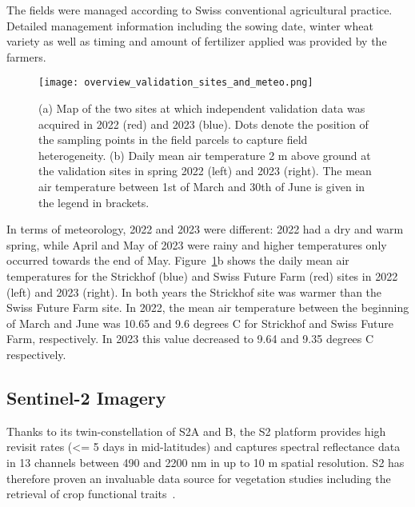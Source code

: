 The fields were managed according to Swiss conventional agricultural practice. Detailed management information including the sowing date, winter wheat variety as well as timing and amount of fertilizer applied was provided by the farmers.

\begin{figure}[H]
    \centering
    \texttt{[image: overview\_validation\_sites\_and\_meteo.png]}
    \caption{(a) Map of the two sites at which independent validation data was acquired in 2022 (red) and 2023 (blue). Dots denote the position of the sampling points in the field parcels to capture field heterogeneity. (b) Daily mean air temperature 2 m above ground at the validation sites in spring 2022 (left) and 2023 (right). The mean air temperature between 1st of March and 30th of June is given in the legend in brackets.}
    \label{fig:map-validation-sites}
\end{figure}

In terms of meteorology, 2022 and 2023 were different: 2022 had a dry and warm spring, while April and May of 2023 were rainy and higher temperatures only occurred towards the end of May. Figure~\ref{fig:map-validation-sites}b shows the daily mean air temperatures for the Strickhof (blue) and Swiss Future Farm (red) sites in 2022 (left) and 2023 (right). In both years the Strickhof site was warmer than the Swiss Future Farm site. In 2022, the mean air temperature between the beginning of March and June was 10.65 and 9.6 degrees C for Strickhof and Swiss Future Farm, respectively. In 2023 this value decreased to 9.64 and 9.35 degrees C respectively.

\subsection{Sentinel-2 Imagery}
\label{subsec:s2-imagery}
Thanks to its twin-constellation of \gls{S2}A and B, the \gls{S2} platform provides high revisit rates (<= 5 days in mid-latitudes) and captures spectral reflectance data in 13 channels between 490 and 2200 nm in up to 10 m spatial resolution. \gls{S2} has therefore proven an invaluable data source for vegetation studies including the retrieval of crop functional traits~\citep[for instance]{amin_prototyping_2021,delloye_retrieval_2018}.

